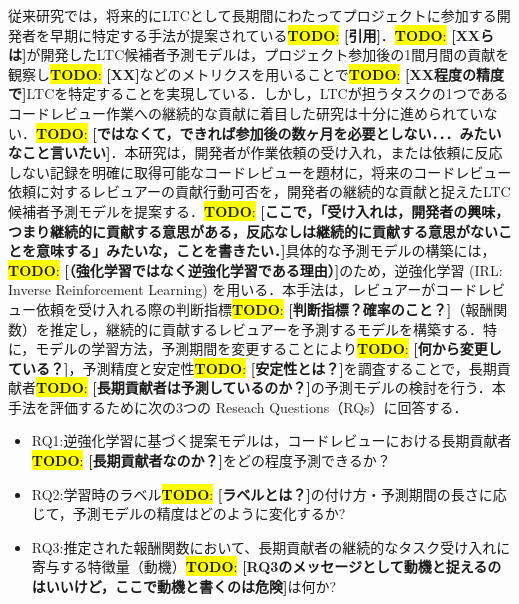 \documentclass[submit,techrep,noauthor]{ipsj}
\newcommand{\todo}[1]{\colorbox{yellow}{{\bf TODO}:}{\color{red} {\textbf{[#1]}}}}
\begin{document}



従来研究では，将来的にLTCとして長期間にわたってプロジェクトに参加する開発者を早期に特定する手法が提案されている\todo{引用}．\todo{XXらは}が開発したLTC候補者予測モデルは，プロジェクト参加後の1間月間の貢献を観察し\todo{XX}などのメトリクスを用いることで\todo{XX程度の精度で}LTCを特定することを実現している．しかし，LTCが担うタスクの1つであるコードレビュー作業への継続的な貢献に着目した研究は十分に進められていない．\todo{ではなくて，できれば参加後の数ヶ月を必要としない．．．みたいなこと言いたい}．本研究は，開発者が作業依頼の受け入れ，または依頼に反応しない記録を明確に取得可能なコードレビューを題材に，将来のコードレビュー依頼に対するレビュアーの貢献行動可否を，開発者の継続的な貢献と捉えたLTC候補者予測モデルを提案する．\todo{ここで，「受け入れは，開発者の興味，つまり継続的に貢献する意思がある，反応なしは継続的に貢献する意思がないことを意味する」みたいな，ことを書きたい．}具体的な予測モデルの構築には，\todo{（強化学習ではなく逆強化学習である理由）}のため，逆強化学習 (IRL: Inverse Reinforcement Learning) を用いる．本手法は，レビュアーがコードレビュー依頼を受け入れる際の判断指標\todo{判断指標？確率のこと？}（報酬関数）を推定し，継続的に貢献するレビュアーを予測するモデルを構築する．特に，モデルの学習方法，予測期間を変更することにより\todo{何から変更している？}，予測精度と安定性\todo{安定性とは？}を調査することで，長期貢献者\todo{長期貢献者は予測しているのか？}の予測モデルの検討を行う．本手法を評価するために次の3つの Reseach Questions（RQs）に回答する．
\begin{itemize}
    \item RQ1:逆強化学習に基づく提案モデルは，コードレビューにおける長期貢献者\todo{長期貢献者なのか？}をどの程度予測できるか？
    \item RQ2:学習時のラベル\todo{ラベルとは？}の付け方・予測期間の長さに応じて，予測モデルの精度はどのように変化するか?
    \item RQ3:推定された報酬関数において、長期貢献者の継続的なタスク受け入れに寄与する特徴量（動機）\todo{RQ3のメッセージとして動機と捉えるのはいいけど，ここで動機と書くのは危険}は何か?
\end{itemize}
\end{document}
